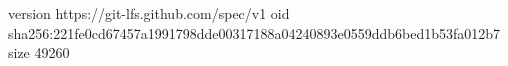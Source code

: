 version https://git-lfs.github.com/spec/v1
oid sha256:221fe0cd67457a1991798dde00317188a04240893e0559ddb6bed1b53fa012b7
size 49260
